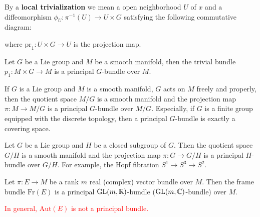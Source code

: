 By a \textbf{local trivialization} we mean a open neighborhood $U$ of $x$ and a diffeomorphism 
$\phi_U: \pi^{-1}(U)\to U\times G$ satisfying the following commutative diagram:
\begin{center}
\end{center}
where $\mathrm{pr}_1: U\times G\to U$ is the projection map.
\begin{example}
    Let $G$ be a Lie group and $M$ be a smooth manifold, then the trivial bundle 
    $p_1: M\times G\to M$ is a principal $G$-bundle over $M$.
\end{example}
\begin{example}
    If $G$ is a Lie group and $M$ is a smooth manifold, $G$ acts on $M$ freely and properly, 
    then the quotient space $M/G$ is a smooth manifold and the projection map $\pi: M\to M/G$ is a principal $G$-bundle over $M/G$.
    Especially, if $G$ is a finite group equipped with the discrete topology, then a principal $G$-bundle is exactly a covering space.
\end{example}
\begin{example}
    Let $G$ be a Lie group and $H$ be a closed subgroup of $G$. 
    Then the quotient space $G/H$ is a smooth manifold and the projection map $\pi: G\to G/H$ 
    is a principal $H$-bundle over $G/H$. For example, the Hopf fibration $S^1\to S^3\to S^2$. 
\end{example}
\begin{example}
    Let $\pi:E\to M$ be a rank $m$ real (complex) vector bundle over $M$. 
    Then the frame bundle $\mathrm{Fr}(E)$ is a principal ${\rm GL}(m,\mathbb{R})$-bundle (${\rm GL}(m,\mathbb{C})$-bundle) over $M$. 
\end{example}
\begin{remark}
    \textcolor{red}{In general, $\mathrm{Aut}(E)$ is not a principal bundle.}
\end{remark}

